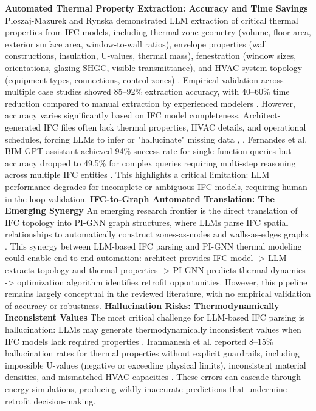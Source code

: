 \documentclass[12pt,a4paper]{article}
\begin{document}
\textbf{Automated Thermal Property Extraction: Accuracy and Time Savings}
Ploszaj-Mazurek and Rynska demonstrated LLM extraction of critical thermal properties from IFC models, including thermal zone geometry (volume, floor area, exterior surface area, window-to-wall ratios), envelope properties (wall constructions, insulation, U-values, thermal mass), fenestration (window sizes, orientations, glazing SHGC, visible transmittance), and HVAC system topology (equipment types, connections, control zones) \cite{ref44}. Empirical validation across multiple case studies showed 85--92\% extraction accuracy, with 40--60\% time reduction compared to manual extraction by experienced modelers \cite{ref44}.
However, accuracy varies significantly based on IFC model completeness. Architect-generated IFC files often lack thermal properties, HVAC details, and operational schedules, forcing LLMs to infer or "hallucinate" missing data \cite{ref44}, \cite{ref21}. Fernandes et al. BIM-GPT assistant achieved 94\% success rate for single-function queries but accuracy dropped to 49.5\% for complex queries requiring multi-step reasoning across multiple IFC entities \cite{ref9}. This highlights a critical limitation: LLM performance degrades for incomplete or ambiguous IFC models, requiring human-in-the-loop validation.
\textbf{IFC-to-Graph Automated Translation: The Emerging Synergy}
An emerging research frontier is the direct translation of IFC topology into PI-GNN graph structures, where LLMs parse IFC spatial relationships to automatically construct zones-as-nodes and walls-as-edges graphs \cite{ref16}. This synergy between LLM-based IFC parsing and PI-GNN thermal modeling could enable end-to-end automation: architect provides IFC model -> LLM extracts topology and thermal properties -> PI-GNN predicts thermal dynamics -> optimization algorithm identifies retrofit opportunities. However, this pipeline remains largely conceptual in the reviewed literature, with no empirical validation of accuracy or robustness.
\textbf{Hallucination Risks: Thermodynamically Inconsistent Values}
The most critical challenge for LLM-based IFC parsing is hallucination: LLMs may generate thermodynamically inconsistent values when IFC models lack required properties \cite{ref21}. Iranmanesh et al. reported 8--15\% hallucination rates for thermal properties without explicit guardrails, including impossible U-values (negative or exceeding physical limits), inconsistent material densities, and mismatched HVAC capacities \cite{ref21}. These errors can cascade through energy simulations, producing wildly inaccurate predictions that undermine retrofit decision-making.
\end{document}
